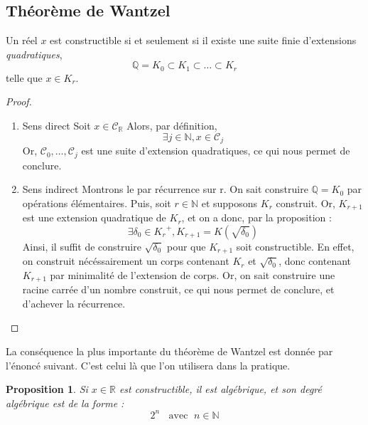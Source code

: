 \documentclass[a4paper,12pt,french]{report}
\newtheorem{proposition}{Proposition}[section]
\begin{document}
		\subsection{Théorème de Wantzel}
			\begin{theorem}
				Un réel \( x \) est constructible si et seulement si il existe une suite finie d'extensions \emph{quadratiques},
					\[
					\mathbb{Q} = K_0 \subset K_1 \subset \dots \subset K_r
					\]
				telle que \( x \in K_r \).
			\end{theorem}
			\begin{proof}
				\begin{enumerate}
					\item{Sens direct}
					Soit \(x \in \mathscr{C}_\mathbb{R}\)
					Alors, par définition, 
					\[\exists j \in \mathbb{N}, x \in \mathscr{C}_j
					\]
					Or, \(\mathscr{C}_0, \dots, \mathscr{C}_j\) est une suite d'extension quadratiques, ce qui nous permet de conclure.
					\item{Sens indirect} Montrons le par récurrence sur r. On sait construire \(\mathbb{Q} = K_0\) par opérations élémentaires. Puis, soit \(r \in \mathbb{N}\) et supposons \(K_r \) construit. Or, \(K_{r+1}\) est une extension quadratique de \(K_{r}\), et on a donc, par la proposition :
					\[
					\exists \delta_0 \in {K_r}^+, K_{r+1} = K(\sqrt{\delta_0})
					\]
					Ainsi, il suffit de construire \(\sqrt{\delta_0}\) pour que \(K_{r+1}\) soit constructible. En effet, on construit nécéssairement un corps contenant \(K_r\) et \(\sqrt{\delta_0}\), donc contenant \(K_{r+1}\) par minimalité de l'extension de corps.
					Or, on sait construire une racine carrée d'un nombre construit, ce qui nous permet de conclure, et d'achever la récurrence.
				\end{enumerate}
			\end{proof}
		La conséquence la plus importante du théorème de Wantzel est donnée par l'énoncé suivant. C'est celui là que l'on utilisera dans la pratique.
			
			\begin{proposition}
			Si $x\in\mathbb{R}$ est constructible, il est algébrique, et son degré algébrique est de la forme : 
			\[{}
				2^{n}\;\;\mbox{ avec }\;n\in\mathbb{N}
			\]
			\end{proposition} 
		     
\end{document}
